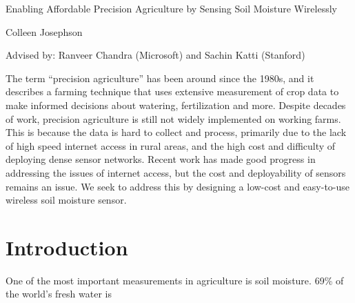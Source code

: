 \documentclass[12pt]{article}
\begin{document}
\begin{center}
{\Large Enabling Affordable Precision Agriculture by Sensing Soil Moisture Wirelessly}

  Colleen Josephson
  
Advised by:  Ranveer Chandra (Microsoft) and Sachin Katti (Stanford)

\end{center}

The term ``precision agriculture'' has been around since the 1980s,
and it describes a farming technique that uses extensive measurement
of crop data to make informed decisions about watering, fertilization
and more. Despite decades of work, precision agriculture is still not
widely implemented on working farms. This is because the data is hard
to collect and process, primarily due to the lack of high speed
internet access in rural areas, and the high cost and difficulty of
deploying dense sensor networks. Recent work \cite{farmbeats} has made good progress in
addressing the issues of internet access, but the cost and
deployability of sensors remains an issue. We seek to address this by designing a low-cost and easy-to-use wireless soil moisture sensor.


\section*{Introduction}

One of the most important measurements in agriculture is soil
moisture. 69\% of the world's fresh water is 



\end{document}
